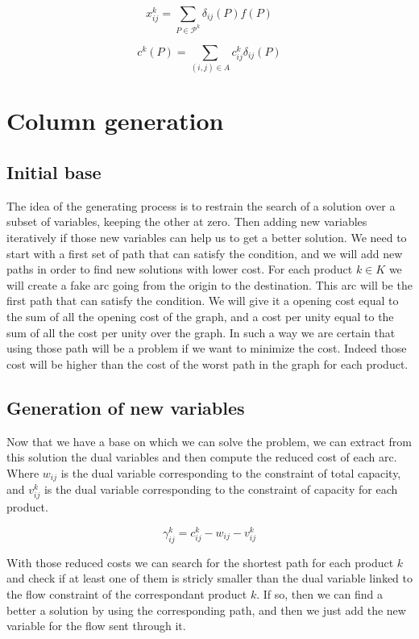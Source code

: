 $$x^k_{ij} = \sum\limits_{P \in \mathcal{P}^k} \delta_{ij} (P) f(P)$$

$$c^k (P) = \sum\limits_{(i,j) \in A} c^k_{ij} \delta_{ij} (P)$$


\section{Column generation}

\subsection{Initial base}

The idea of the generating process is to restrain the search of a solution over a subset of variables, keeping the other at zero. Then adding new variables iteratively if those new variables can help us to get a better solution. We need to start with a first set of path that can satisfy the condition, and we will add new paths in order to find new solutions with lower cost. For each product $k \in K$ we will create a fake arc going from the origin to the destination. This arc will be the first path that can satisfy the condition. We will give it a opening cost equal to the sum of all the opening cost of the graph, and a cost per unity equal to the sum of all the cost per unity over the graph. In such a way we are certain that using those path will be a problem if we want to minimize the cost. Indeed those cost will be higher than the cost of the worst path in the graph for each product.

\subsection{Generation of new variables}

Now that we have a base on which we can solve the problem, we can extract from this solution the dual variables and then compute the reduced cost of each arc. Where $w_{ij}$ is the dual variable corresponding to the constraint of total capacity, and $v^k_{ij}$ is the dual variable corresponding to the constraint of capacity for each product.

$$\gamma^k_{ij}=c^k_{ij}-w_{ij}-v^k_{ij}$$

With those reduced costs we can search for the shortest path for each product $k$ and check if at least one of them is stricly smaller than the dual variable linked to the flow constraint of the correspondant product $k$. If so, then we can find a better a solution by using the corresponding path, and then we just add the new variable for the flow sent through it.

